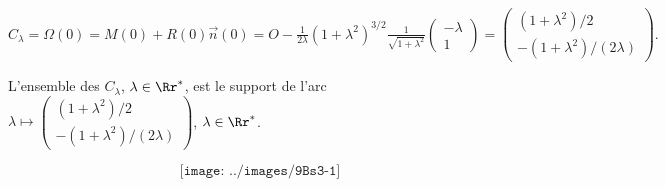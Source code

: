 {{\begin{center}
$C_\lambda=\Omega(0)=M(0)+R(0)\overrightarrow{n}(0)=O-\frac{1}{2\lambda}(1+\lambda^2)^{3/2}\frac{1}{\sqrt{1+\lambda^2}}\left(
\begin{array}{c}
-\lambda\\
1
\end{array}
\right)=\left(
\begin{array}{c}
(1+\lambda^2)/2\\
-(1+\lambda^2)/(2\lambda)
\end{array}
\right).$
\end{center}
L'ensemble des $C_\lambda$, $\lambda\in\Rr^*$, est le support de l'arc $\lambda\mapsto\left(
\begin{array}{c}
(1+\lambda^2)/2\\
-(1+\lambda^2)/(2\lambda)
\end{array}
\right)$, $\lambda\in\Rr^*$.

$$\texttt{[image: ../images/9Bs3-1]}$$
}
}
